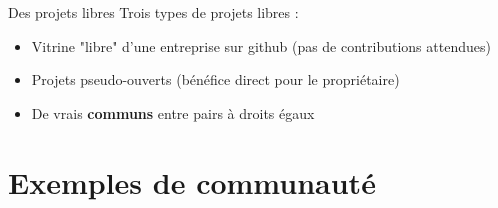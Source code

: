 \documentclass{beamer}
\begin{document}
\begin{frame}{Des projets libres}
  Trois types de projets libres :
  \begin{itemize}
  \item Vitrine "libre" d'une entreprise sur github (pas de contributions attendues)
  \item Projets pseudo-ouverts (bénéfice direct pour le propriétaire)
  \item De vrais \textbf{communs} entre pairs à droits égaux
  \end{itemize}
\end{frame}

\section{Exemples de communauté}


\begin{frame}[plain]%
%  
\end{frame}
\end{document}
